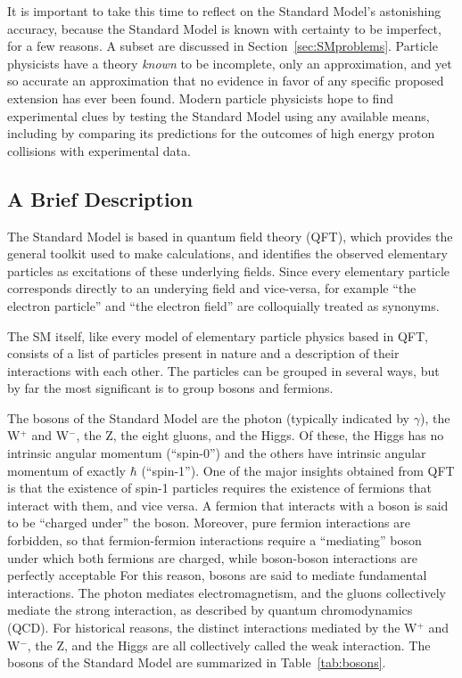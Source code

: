 It is important to take this time to reflect on the Standard Model's astonishing accuracy, because the Standard Model is known with certainty to be imperfect, for a few reasons. 
A subset are discussed in Section~\ref{sec:SMproblems}.
Particle physicists have a theory {\it known} to be incomplete, only an approximation, and yet so accurate an approximation that no evidence in favor of any specific proposed extension has ever been found.
Modern particle physicists hope to find experimental clues by testing the Standard Model using any available means, including by comparing its predictions for the outcomes of high energy proton collisions with experimental data.

  \subsection{A Brief Description} \label{sec:SMdescription}

  The Standard Model is based in quantum field theory (QFT), which provides the general toolkit used to make calculations, and identifies the observed elementary particles as excitations of these underlying fields.
  Since every elementary particle corresponds directly to an underying field and vice-versa, for example ``the electron particle'' and ``the electron field'' are colloquially treated as synonyms.

  The SM itself, like every model of elementary particle physics based in QFT, consists of a list of particles present in nature and a description of their interactions with each other.
  The particles can be grouped in several ways, but by far the most significant is to group bosons and fermions.

  The bosons of the Standard Model are the photon (typically indicated by $\gamma$), the W$^+$ and W$^-$, the Z, the eight gluons, and the Higgs.
  Of these, the Higgs has no intrinsic angular momentum (``spin-0'') and the others have intrinsic angular momentum of exactly $\hbar$ (``spin-1'').
  One of the major insights obtained from QFT is that the existence of spin-1 particles requires the existence of fermions that interact with them, and vice versa.
  A fermion that interacts with a boson is said to be ``charged under'' the boson.
  Moreover, pure fermion interactions are forbidden, so that fermion-fermion interactions require a ``mediating'' boson under which both fermions are charged, while boson-boson interactions are perfectly acceptable
  For this reason, bosons are said to mediate fundamental interactions.
  The photon mediates electromagnetism, and the gluons collectively mediate the strong interaction, as described by quantum chromodynamics (QCD).
  For historical reasons, the distinct interactions mediated by the W$^+$ and W$^-$, the Z, and the Higgs are all collectively called the weak interaction.
  The bosons of the Standard Model are summarized in Table~\ref{tab:bosons}.

